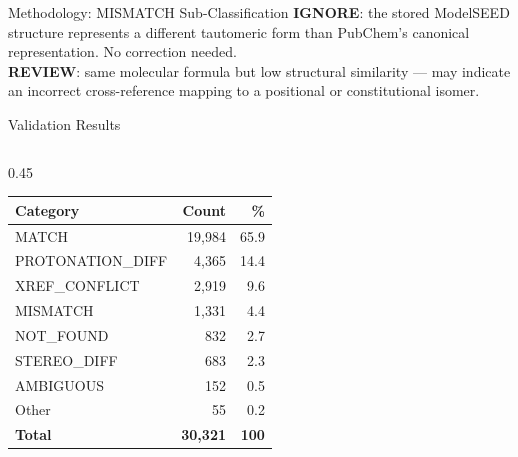 \documentclass[aspectratio=169,11pt]{beamer}
\begin{document}
\begin{frame}{Methodology: MISMATCH Sub-Classification}
\smallskip
\footnotesize
\textbf{IGNORE}: the stored ModelSEED structure represents a different
tautomeric form than PubChem's canonical representation. No correction needed.\\
\textbf{REVIEW}: same molecular formula but low structural similarity ---
may indicate an incorrect cross-reference mapping to a positional or constitutional isomer.

\end{frame}


\begin{frame}{Validation Results}

\begin{columns}[T]
\begin{column}{0.45\textwidth}
\begin{table}[h]
\centering
\begin{tabular}{lrr}
\toprule
\textbf{Category} & \textbf{Count} & \textbf{\%} \\
\midrule
MATCH              & 19,984 & 65.9 \\
PROTONATION\_DIFF  &  4,365 & 14.4 \\
XREF\_CONFLICT     &  2,919 &  9.6 \\
MISMATCH           &  1,331 &  4.4 \\
NOT\_FOUND         &    832 &  2.7 \\
STEREO\_DIFF       &    683 &  2.3 \\
AMBIGUOUS          &    152 &  0.5 \\
Other              &     55 &  0.2 \\
\midrule
\textbf{Total}     & \textbf{30,321} & \textbf{100} \\
\bottomrule
\end{tabular}
\end{table}
\end{column}


\end{columns}
\end{frame}
\end{document}
